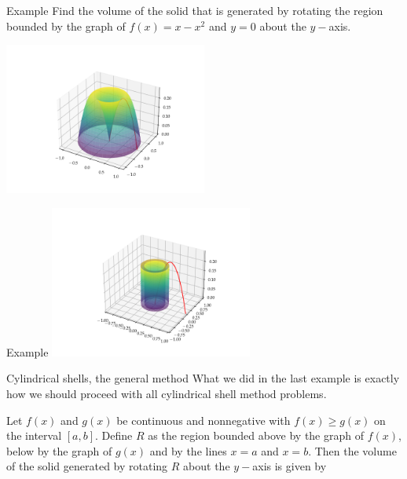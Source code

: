\documentclass[presentation]{beamer}
\begin{document}
\begin{frame}[label={sec:org7b44d2e}]{Example}
Find the volume of the solid that is generated by rotating the region
bounded by the graph of \(f \left( x \right) = x - x^2\) and \(y = 0\) about the \(y-\)axis.

\begin{center}
\includegraphics[width=0.5\textwidth]{../img/day008-ex01.png}
\end{center}
\vspace{10in}
\end{frame}

\begin{frame}[label={sec:orgdfb0a1b}]{Example}
\includegraphics[width=0.5\textwidth]{../img/day008-ex02.png}
\vspace{10in}
\end{frame}


\begin{frame}[label={sec:org71ff232}]{Cylindrical shells, the general method}
What we did in the last example is exactly how we should proceed with
all cylindrical shell method problems.
\begin{theorem}
Let \(f \left( x \right)\) and \(g \left( x \right)\) be continuous
and nonnegative with \(f \left( x \right) \ge g \left( x \right)\) on
the interval \(\left[ a,b \right]\).  Define \(R\) as the region
bounded above by the graph of \(f \left( x \right)\), below by the
graph of \(g \left( x \right)\) and by the lines \(x=a\) and \(x=b\). Then the volume of the solid generated by rotating \(R\) about the
\(y-\)axis is given by
\[
 \]
 \phantom{butts}

\phantom{butts}
\end{theorem}
\end{frame}
\end{document}
